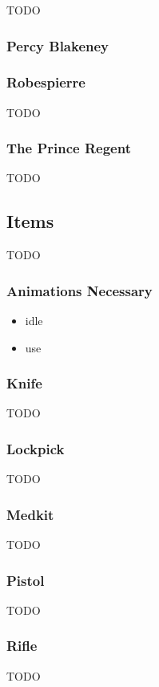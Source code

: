 TODO

\subsubsection{Percy Blakeney}


\subsubsection{Robespierre}

TODO

\subsubsection{The Prince Regent}

TODO

\subsection{Items}

TODO

\subsubsection{Animations Necessary}

\begin{itemize}

\item idle
\item use

\end{itemize}

\subsubsection{Knife}

TODO

\subsubsection{Lockpick}

TODO

\subsubsection{Medkit}

TODO

\subsubsection{Pistol}

TODO

\subsubsection{Rifle}

TODO
